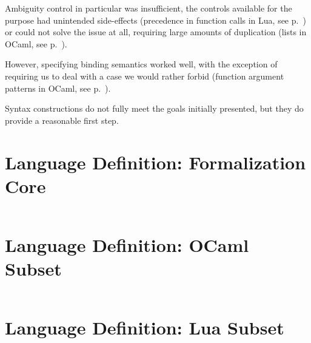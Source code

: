 \documentclass{kththesis}
\begin{document}
Ambiguity control in particular was insufficient, the controls available for the purpose had unintended side-effects (precedence in function calls in Lua, see p.~\pageref{sec:lua-func-call-precedence}) or could not solve the issue at all, requiring large amounts of duplication (lists in OCaml, see p.~\pageref{sec:ambiguous-lists}).

However, specifying binding semantics worked well, with the exception of requiring us to deal with a case we would rather forbid (function argument patterns in OCaml, see p.~\pageref{sec:ocaml-function-argument-patterns}).

Syntax constructions do not fully meet the goals initially presented, but they do provide a reasonable first step.

\printbibliography[heading=bibintoc]

\appendix

\chapter{Language Definition: Formalization Core} \label{sec:formal-core}

\inputminted{syncon}{implementation/languages/formalization-example/core}

\chapter{Language Definition: OCaml Subset} \label{sec:appendix-ocaml}

\inputminted{syncon}{implementation/languages/ocaml/language}

\chapter{Language Definition: Lua Subset} \label{sec:appendix-lua}

\inputminted{syncon}{implementation/languages/lua/language}
\end{document}
